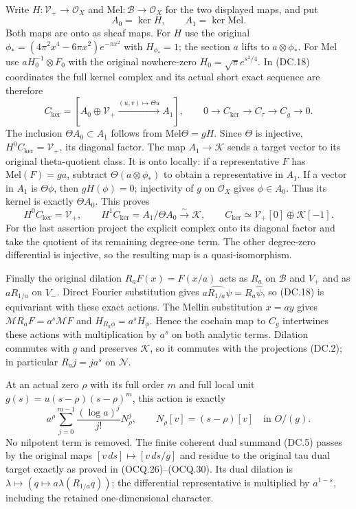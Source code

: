 Write $H:\mathcal V_+\to\mathcal O_X$ and
$\mathrm{Mel}:\mathcal B\to\mathcal O_X$ for the two displayed
maps, and put
\[
 A_0=\ker H,\qquad A_1=\ker\mathrm{Mel}.
 \tag{DC.20}
\]
Both maps are onto as sheaf maps.  For $H$ use the original
$\phi_*=(4\pi^2x^4-6\pi x^2)e^{-\pi x^2}$ with $H_{\phi_*}=1$;
the section $a$ lifts to $a\otimes\phi_*$.  For $\mathrm{Mel}$
use $aH_0^{-1}\otimes F_0$ with the original nowhere-zero
$H_0=\sqrt\pi e^{s^2/4}$.  In (DC.18) coordinates the full
kernel complex and its actual short exact sequence are therefore
\[
 C_{\ker}=[A_0\oplus\mathcal V_+
       \xrightarrow{(u,v)\mapsto\Theta u}A_1],\qquad
 0\to C_{\ker}\to C_\tau\to C_g\to0.
 \tag{DC.21}
\]
The inclusion $\Theta A_0\subset A_1$ follows from
$\mathrm{Mel}\Theta=gH$.  Since $\Theta$ is injective,
$H^0C_{\ker}=\mathcal V_+$, its diagonal factor.  The map
$A_1\to\mathcal K$ sends a target vector to its original
theta-quotient class.  It is onto locally: if a representative $F$
has $\mathrm{Mel}(F)=ga$, subtract
$\Theta(a\otimes\phi_*)$ to obtain a representative in $A_1$.
If a vector in $A_1$ is $\Theta\phi$, then $gH(\phi)=0$;
injectivity of $g$ on $\mathcal O_X$ gives $\phi\in A_0$.
Thus its kernel is exactly $\Theta A_0$.  This proves
\[
 H^0C_{\ker}=\mathcal V_+,\qquad
 H^1C_{\ker}=A_1/\Theta A_0\xrightarrow{\sim}\mathcal K,
 \qquad
 C_{\ker}\simeq\mathcal V_+[0]\oplus\mathcal K[-1].
 \tag{DC.22}
\]
For the last assertion project the explicit complex onto its
diagonal factor and take the quotient of its remaining degree-one
term.  The other degree-zero differential is injective, so the
resulting map is a quasi-isomorphism.

Finally the original dilation $R_aF(x)=F(x/a)$ acts as $R_a$ on
$\mathscr B$ and $V_+$ and as $aR_{1/a}$ on $V_-$.
Direct Fourier substitution gives
$\widehat{aR_{1/a}\psi}=R_a\widehat\psi$, so (DC.18) is
equivariant with these exact actions.  The Mellin substitution
$x=ay$ gives $\mathcal M R_aF=a^s\mathcal MF$ and
$H_{R_a\phi}=a^sH_\phi$.  Hence the cochain map to $C_g$
intertwines these actions with multiplication by $a^s$ on both
analytic terms.  Dilation commutes with $g$ and preserves
$\mathcal K$, so it commutes with the projections (DC.2);
in particular $R_a j=j a^s$ on $\mathcal N$.

At an actual zero $\rho$ with its full order $m$ and full local
unit $g(s)=u(s-\rho)(s-\rho)^m$, this action is exactly
\[
 a^\rho\sum_{j=0}^{m-1}\frac{(\log a)^j}{j!}N_\rho^j,
 \qquad N_\rho[v]=(s-\rho)[v]\quad\text{in }O/(g).
 \tag{DC.23}
\]
No nilpotent term is removed.  The finite coherent dual summand
(DC.5) passes by the original maps
$[v\,ds]\mapsto[v\,ds/g]$ and residue to the original tau
dual target exactly as proved in (OCQ.26)--(OCQ.30).  Its dual
dilation is $\lambda\mapsto(q\mapsto a\lambda(R_{1/a}q))$;
the differential representative is multiplied by $a^{1-s}$,
including the retained one-dimensional character.

